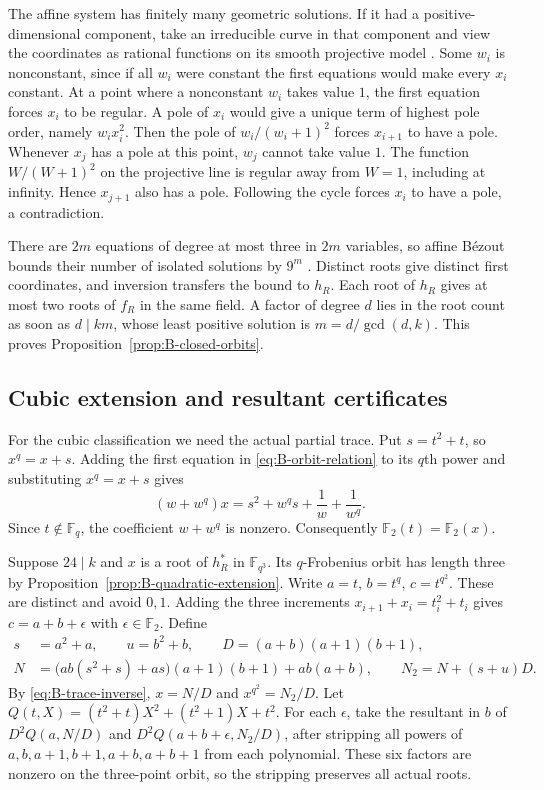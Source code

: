 \documentclass[11pt]{article}
\theoremstyle{definition}
\theoremstyle{remark}
\begin{document}
The affine system has finitely many geometric solutions.
If it had a positive-dimensional component, take an irreducible
curve in that component and view the coordinates as rational
functions on its smooth projective model \cite[Section 53.2]{StacksCurves}.
Some $w_i$ is nonconstant, since if all $w_i$ were constant
the first equations would make every $x_i$ constant.
At a point where a nonconstant $w_i$ takes value $1$, the first
equation forces $x_i$ to be regular. A pole of $x_i$ would give
a unique term of highest pole order, namely $w_ix_i^2$.
Then the pole of $w_i/(w_i+1)^2$ forces $x_{i+1}$ to have a pole.
Whenever $x_j$ has a pole at this point, $w_j$ cannot take value
$1$. The function $W/(W+1)^2$ on the projective line is regular
away from $W=1$, including at infinity. Hence $x_{j+1}$ also has a pole.
Following the cycle forces $x_i$ to have a pole, a contradiction.

There are $2m$ equations of degree at most three in $2m$ variables,
so affine B\'ezout bounds their number of isolated solutions by
$9^m$ \cite[Theorem I.2]{MondalZeroes}. Distinct roots give
distinct first coordinates, and inversion transfers the bound
to $h_R$. Each root of $h_R$ gives at most two roots of $f_R$
in the same field. A factor of degree $d$ lies in the root count
as soon as $d\mid km$, whose least positive solution is
$m=d/\gcd(d,k)$. This proves Proposition~\ref{prop:B-closed-orbits}.

\subsection{Cubic extension and resultant certificates}
For the cubic classification we need the actual partial trace.
Put $s=t^2+t$, so $x^q=x+s$.
Adding the first equation in \eqref{eq:B-orbit-relation} to its
$q$th power and substituting $x^q=x+s$ gives
\begin{equation}\label{eq:B-trace-inverse}
 (w+w^q)x=s^2+w^q s+\frac1w+\frac1{w^q}.
\end{equation}
Since $t\notin\mathbb F_q$, the coefficient $w+w^q$ is nonzero.
Consequently $\mathbb F_2(t)=\mathbb F_2(x)$.

Suppose $24\mid k$ and $x$ is a root of $h_R^*$ in $\mathbb F_{q^3}$.
Its $q$-Frobenius orbit has length three by
Proposition~\ref{prop:B-quadratic-extension}. Write
$a=t$, $b=t^q$, $c=t^{q^2}$. These are distinct and avoid $0,1$.
Adding the three increments $x_{i+1}+x_i=t_i^2+t_i$
gives $c=a+b+\epsilon$ with $\epsilon\in\mathbb F_2$.
Define
\begin{align*}
 s&=a^2+a,\qquad u=b^2+b,\qquad D=(a+b)(a+1)(b+1),\\
 N&=\bigl(ab(s^2+s)+as\bigr)(a+1)(b+1)+ab(a+b),\qquad
 N_2=N+(s+u)D .
\end{align*}
By \eqref{eq:B-trace-inverse}, $x=N/D$ and $x^{q^2}=N_2/D$.
Let $Q(t,X)=(t^2+t)X^2+(t^2+1)X+t^2$.
For each $\epsilon$, take the resultant in $b$ of
$D^2Q(a,N/D)$ and $D^2Q(a+b+\epsilon,N_2/D)$,
after stripping all powers of $a,b,a+1,b+1,a+b,a+b+1$
from each polynomial. These six factors are nonzero on
the three-point orbit, so the stripping preserves all actual roots.
\end{document}
